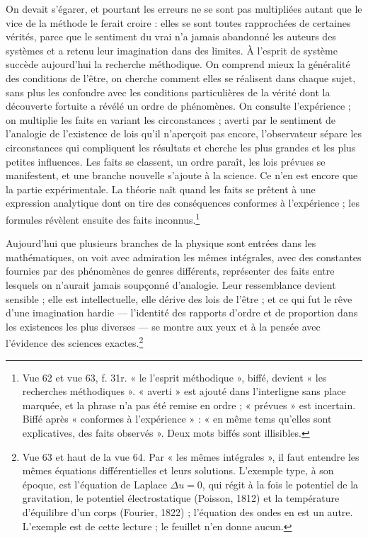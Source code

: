 \documentclass[11pt,a4paper]{article}
\begin{document}
On devait s'égarer, et pourtant les erreurs ne se sont pas multipliées autant que
le vice de la méthode le ferait croire : elles se sont toutes rapprochées de
certaines vérités, parce que le sentiment du vrai n'a jamais abandonné les
auteurs des systèmes et a retenu leur imagination dans des limites. À l'esprit de
système succède aujourd'hui la recherche méthodique. On comprend mieux la
généralité des conditions de l'être, on cherche comment elles se réalisent dans
chaque sujet, sans plus les confondre avec les conditions particulières de la
vérité dont la découverte fortuite a révélé un ordre de phénomènes. On consulte
l'expérience ; on multiplie les faits en variant les circonstances ; averti par
le sentiment de l'analogie de l'existence de lois qu'il n'aperçoit pas encore,
l'observateur sépare les circonstances qui compliquent les résultats et cherche
les plus grandes et les plus petites influences. Les faits se classent, un ordre
paraît, les lois prévues se manifestent, et une branche nouvelle s'ajoute à la
science. Ce n'en est encore que la partie expérimentale. La théorie naît quand
les faits se prêtent à une expression analytique dont on tire des conséquences
conformes à l'expérience ; les formules révèlent ensuite des faits
inconnus.\footnote{Vue 62 et vue 63, f. 31r. « le l'esprit méthodique », biffé,
devient « les recherches méthodiques ». « averti » est ajouté dans l'interligne
sans place marquée, et la phrase n'a pas été remise en ordre ; « prévues » est
incertain. Biffé après « conformes à l'expérience » : « en même tems qu'elles
sont explicatives, des faits observés ». Deux mots biffés sont illisibles.}

Aujourd'hui que plusieurs branches de la physique sont entrées dans les
mathématiques, on voit avec admiration les mêmes intégrales, avec des constantes
fournies par des phénomènes de genres différents, représenter des faits entre
lesquels on n'aurait jamais soupçonné d'analogie. Leur ressemblance devient
sensible ; elle est intellectuelle, elle dérive des lois de l'être ; et ce qui
fut le rêve d'une imagination hardie — l'identité des rapports d'ordre et de
proportion dans les existences les plus diverses — se montre aux yeux et à la
pensée avec l'évidence des sciences exactes.\footnote{Vue 63 et haut de la vue
64. Par « les mêmes intégrales », il faut entendre les mêmes équations
différentielles et leurs solutions. L'exemple type, à son époque, est
l'équation de Laplace $\Delta u = 0$, qui régit à la fois le potentiel de la
gravitation, le potentiel électrostatique (Poisson, 1812) et la température
d'équilibre d'un corps (Fourier, 1822) ; l'équation des ondes en est un autre.
L'exemple est de cette lecture ; le feuillet n'en donne aucun.}
\end{document}
